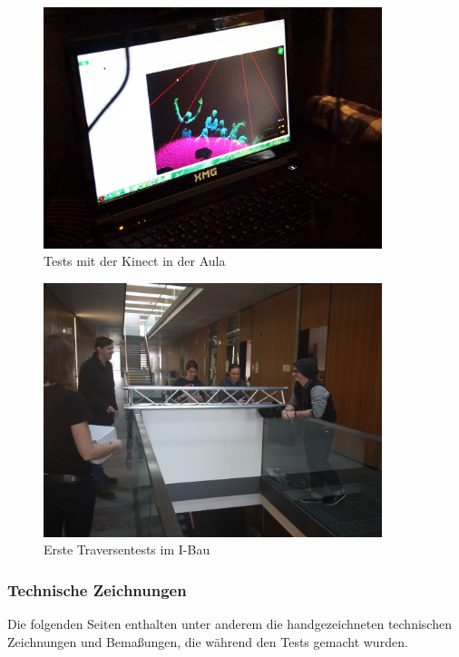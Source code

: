 \begin{figure}[htbp]
	\centering
		\includegraphics[width=0.88\textwidth]{images/Test3.png}
	\caption{Tests mit der Kinect in der Aula}
	\label{fig:Test3}
\end{figure}

\begin{figure}[htbp]
	\centering
		\includegraphics[width=0.88\textwidth]{images/Test4.jpg}
	\caption{Erste Traversentests im I-Bau}
	\label{fig:Test4}
\end{figure}
\clearpage

\subsubsection{Technische Zeichnungen}
Die folgenden Seiten enthalten unter anderem die handgezeichneten technischen Zeichnungen und Bemaßungen, die während den Tests gemacht wurden.

